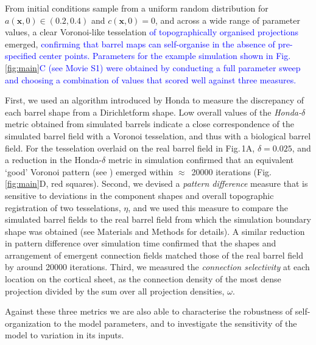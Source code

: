 \documentclass[9pt,lineno]{elife}
\newcommand{\cmnt}[1]{\textcolor{blue}{#1}}
\newcommand{\metrics}[1]{\textcolor{revred}{#1}}
\newcommand{\mb}[1]{\mathbf{#1}}
\begin{document}
From initial conditions sample from a uniform random distribution for
$a(\mb{x},0)\in(0.2,0.4)$ and $c(\mb{x},0)=0$, and across a wide range of
parameter values,
a clear Voronoi-like tesselation \cmnt{of topographically organised
  projections} emerged, \cmnt{confirming that barrel maps can self-organise in
  the absence of pre-specified center points. Parameters for the example
  simulation shown in Fig.\,\ref{fig:main}C (see Movie S1) were obtained by
  conducting a full parameter sweep and choosing a combination of values that
  scored well against three measures.}

\metrics{First, we used an algorithm introduced by Honda to measure the
  discrepancy of each barrel shape from a Dirichletform shape. Low
  overall values of the \emph{Honda-}$\delta$ metric obtained from simulated
  barrels indicate a close correspondence of the simulated barrel field with a
  Voronoi tesselation, and thus with a biological barrel field. For the
  tesselation overlaid on the real barrel field in Fig.\,1A, $\delta=0.025$,
  and a reduction in the Honda-$\delta$ metric in simulation
  confirmed that an equivalent `good' Voronoi pattern} (see
    \citealp{senft_mouse_1991}) \metrics{emerged within $\approx$~20000
  iterations (Fig.\,\ref{fig:main}D, red squares). Second, we devised a
  \emph{pattern difference} measure that is sensitive to deviations in the
  component shapes and overall topographic registration of two tesselations,
  $\eta$, and we used this measure to compare the simulated barrel fields to
  the real barrel field from which the simulation boundary shape was obtained
  (see Materials and Methods for details). A similar reduction in pattern
  difference over simulation time confirmed that the shapes and arrangement of
  emergent connection fields matched those of the real barrel field by around
  20000 iterations. Third, we measured the \emph{connection selectivity} at
  each location on the cortical sheet, as the connection density of the most
  dense projection divided by the sum over all projection densities, $\omega$.}

\metrics{Against these three metrics we are also able to characterise the
  robustness of self-organization to the model parameters, and to investigate
  the sensitivity of the model to variation in its inputs.}
\end{document}
